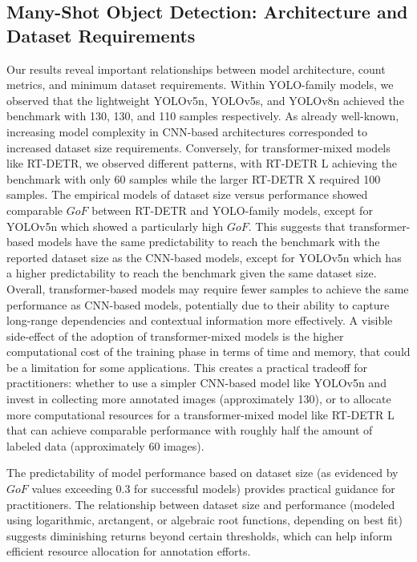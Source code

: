 \documentclass[12pt,a4paper,oneside]{report}
\begin{document}
\subsection{Many-Shot Object Detection: Architecture and Dataset Requirements}
Our results reveal important relationships between model architecture, count metrics, 
and minimum dataset requirements. Within YOLO-family models, we observed that the lightweight 
YOLOv5n, YOLOv5s, and YOLOv8n achieved the benchmark with 130, 130, and 110 samples respectively. 
As already well-known, increasing model complexity in CNN-based architectures corresponded to increased 
dataset size requirements.
Conversely, for transformer-mixed models like RT-DETR, we observed different patterns, with RT-DETR L achieving 
the benchmark with only 60 samples while the larger RT-DETR X required 100 samples. The
empirical models of dataset size versus performance showed comparable $GoF$ between RT-DETR and YOLO-family models,
except for YOLOv5n which showed a particularly high $GoF$. This suggests that transformer-based models have
the same predictability to reach the benchmark with the reported dataset size as the CNN-based models, except
for YOLOv5n which has a higher predictability to reach the benchmark given the same dataset size.
Overall, transformer-based models may require fewer samples to achieve the same performance as CNN-based models,
potentially due to their ability to capture long-range dependencies and contextual information more effectively.
A visible side-effect of the adoption of transformer-mixed models is the higher computational cost
of the training phase in terms of time and memory, that could be a limitation for some applications.
This creates a practical tradeoff for practitioners: whether to use a simpler CNN-based model like YOLOv5n 
and invest in collecting more annotated images (approximately 130), or to allocate more computational 
resources for a transformer-mixed model like RT-DETR L that can achieve comparable performance with 
roughly half the amount of labeled data (approximately 60 images).

The predictability of model performance based on dataset size (as evidenced by $GoF$ values exceeding 0.3 
for successful models) provides practical guidance for practitioners. The relationship between dataset 
size and performance (modeled using logarithmic, arctangent, or algebraic root 
functions, depending on best fit) suggests diminishing returns beyond certain thresholds, 
which can help inform efficient resource allocation for annotation efforts.
\end{document}
